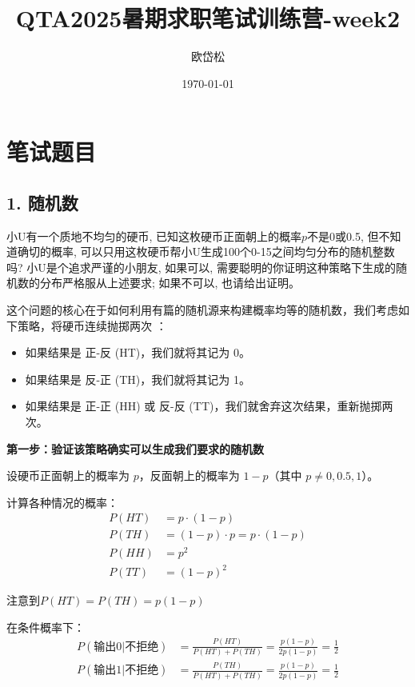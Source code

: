 \documentclass[UTF8]{ctexart}
\title{QTA2025暑期求职笔试训练营-week2}
\author{欧岱松}
\date{\today{}}
\begin{document}
\maketitle

\section*{笔试题目}

\subsection*{1. 随机数}
小U有一个质地不均匀的硬币, 已知这枚硬币正面朝上的概率$p$不是0或0.5, 但不知道确切的概率, 可以只用这枚硬币帮小U生成100个0-15之间均匀分布的随机整数吗? 小U是个追求严谨的小朋友, 如果可以, 需要聪明的你证明这种策略下生成的随机数的分布严格服从上述要求; 如果不可以, 也请给出证明。

这个问题的核心在于如何利用有篇的随机源来构建概率均等的随机数，我们考虑如下策略，将硬币连续抛掷两次 ：
\begin{itemize}
    \item 如果结果是 正-反 (HT)，我们就将其记为 0。

    \item 如果结果是 反-正 (TH)，我们就将其记为 1。
    
    \item 如果结果是 正-正 (HH) 或 反-反 (TT)，我们就舍弃这次结果，重新抛掷两次。    
    
\end{itemize}

\textbf{第一步：验证该策略确实可以生成我们要求的随机数}

设硬币正面朝上的概率为 $p$，反面朝上的概率为 $1-p$（其中 $p \neq 0, 0.5, 1$）。

计算各种情况的概率：
\begin{align}
P(HT) &= p \cdot (1-p) \\
P(TH) &= (1-p) \cdot p = p \cdot (1-p) \\
P(HH) &= p^2 \\
P(TT) &= (1-p)^2
\end{align}

注意到$P(HT) = P(TH) = p(1-p)$

在条件概率下：
\begin{align}
P(\text{输出0} | \text{不拒绝}) &= \frac{P(HT)}{P(HT) + P(TH)} =
\frac{p(1-p)}{2p(1-p)} = \frac{1}{2} \\
P(\text{输出1} | \text{不拒绝}) &= \frac{P(TH)}{P(HT) + P(TH)} =
\frac{p(1-p)}{2p(1-p)} = \frac{1}{2}
\end{align}
\end{document}
